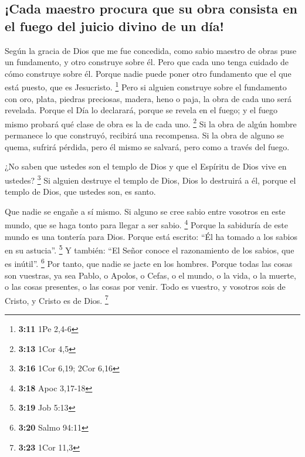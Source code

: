 \hypertarget{cada-maestro-procura-que-su-obra-consista-en-el-fuego-del-juicio-divino-de-un-duxeda}{%
\subsection{¡Cada maestro procura que su obra consista en el fuego del
juicio divino de un
día!}\label{cada-maestro-procura-que-su-obra-consista-en-el-fuego-del-juicio-divino-de-un-duxeda}}

 Según la gracia de Dios que me fue concedida, como sabio
maestro de obras puse un fundamento, y otro construye sobre él. Pero que
cada uno tenga cuidado de cómo construye sobre él. 
Porque nadie puede poner otro fundamento que el que está puesto, que es
Jesucristo. \footnote{\textbf{3:11} 1Pe 2,4-6}  Pero si
alguien construye sobre el fundamento con oro, plata, piedras preciosas,
madera, heno o paja,  la obra de cada uno será revelada.
Porque el Día lo declarará, porque se revela en el fuego; y el fuego
mismo probará qué clase de obra es la de cada uno. \footnote{\textbf{3:13}
  1Cor 4,5}  Si la obra de algún hombre permanece lo que
construyó, recibirá una recompensa.  Si la obra de alguno
se quema, sufrirá pérdida, pero él mismo se salvará, pero como a través
del fuego.

 ¿No saben que ustedes son el templo de Dios y que el
Espíritu de Dios vive en ustedes? \footnote{\textbf{3:16} 1Cor 6,19;
  2Cor 6,16}  Si alguien destruye el templo de Dios, Dios
lo destruirá a él, porque el templo de Dios, que ustedes son, es santo.

 Que nadie se engañe a sí mismo. Si alguno se cree sabio
entre vosotros en este mundo, que se haga tonto para llegar a ser sabio.
\footnote{\textbf{3:18} Apoc 3,17-18}  Porque la
sabiduría de este mundo es una tontería para Dios. Porque está escrito:
``Él ha tomado a los sabios en su astucia''. \footnote{\textbf{3:19} Job
  5:13}  Y también: ``El Señor conoce el razonamiento de
los sabios, que es inútil''. \footnote{\textbf{3:20} Salmo 94:11}
 Por tanto, que nadie se jacte en los hombres. Porque
todas las cosas son vuestras,  ya sea Pablo, o Apolos, o
Cefas, o el mundo, o la vida, o la muerte, o las cosas presentes, o las
cosas por venir. Todo es vuestro,  y vosotros sois de
Cristo, y Cristo es de Dios. \footnote{\textbf{3:23} 1Cor 11,3}

